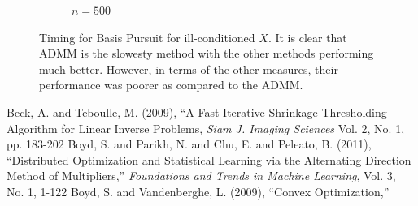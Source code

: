 \documentclass[12pt, leqno]{article}
\theoremstyle{remark}
\begin{document}
\begin{figure}[H]
\begin{subfigure}[b]{0.4\textwidth}
        \caption{$n=500$}
        \label{fig:500}
    \end{subfigure}
\caption{Timing for Basis Pursuit for ill-conditioned $X$. It is clear that ADMM is the slowesty method with the other methods performing much better. However, in terms of the other measures, their performance was poorer as compared to the ADMM.}
\label{fig:timingcn}
\end{figure}

\pagebreak

\begin{thebibliography}{Tototo}
 Beck, A. and Teboulle, M. (2009), {``A Fast Iterative Shrinkage-Thresholding Algorithm
for Linear Inverse Problems}, \emph{Siam J. Imaging Sciences} Vol. 2, No. 1, pp. 183-202
 Boyd, S. and Parikh, N. and Chu, E. and Peleato, B.  (2011), {``Distributed Optimization and Statistical Learning via the Alternating Direction Method of Multipliers,''} \emph{Foundations and Trends in
Machine Learning}, Vol. 3, No. 1, 1-122
  Boyd, S. and Vandenberghe, L. (2009), {``Convex Optimization,''} 
\end{thebibliography}
\end{document}
